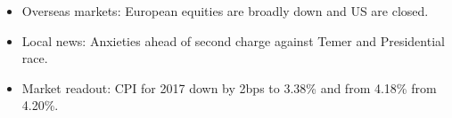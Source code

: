 \begin{itemize}
\tightlist
\item
  Overseas markets: European equities are broadly down and US are
  closed.
\item
  Local news: Anxieties ahead of second charge against Temer and
  Presidential race.
\item
  Market readout: CPI for 2017 down by 2bps to 3.38\% and from 4.18\%
  from 4.20\%.
\end{itemize}
